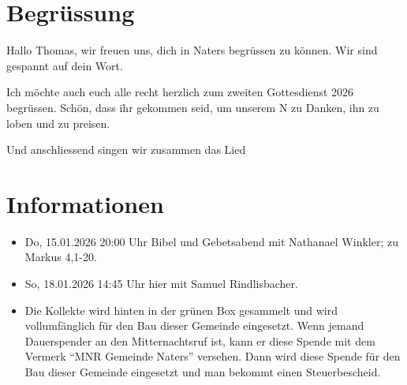 \documentclass[fontsize=14pt]{mybib}
\newcommand{\Name}{Thomas}
\begin{document}
\section{Begrüssung}
Hallo \Name{}, wir freuen uns, dich in Naters begrüssen zu können. Wir sind gespannt auf dein Wort.

Ich möchte auch euch alle recht herzlich zum zweiten Gottesdienst 2026 begrüssen. Schön, dass ihr gekommen seid, um unserem \herr N zu Danken, ihn zu loben und zu preisen.

\beten{} Und anschliessend singen wir zusammen das Lied



\section{Informationen}
\begin{itemize}
    \item {} Do, 15.01.2026 20:00 Uhr Bibel und Gebetsabend mit Nathanael Winkler; zu Markus 4,1-20.
    \item {} So, 18.01.2026 14:45 Uhr hier mit Samuel Rindlisbacher. 
    \item {} Die Kollekte wird hinten in der grünen Box gesammelt und wird vollumfänglich für den Bau dieser Gemeinde eingesetzt.\newline
    Wenn jemand Dauerspender an den Mitternachtsruf ist, kann er diese Spende mit dem Vermerk \enquote{MNR Gemeinde Naters} versehen. Dann wird diese Spende für den Bau dieser Gemeinde eingesetzt und man bekommt einen Steuerbescheid.    
\end{itemize}
\end{document}
